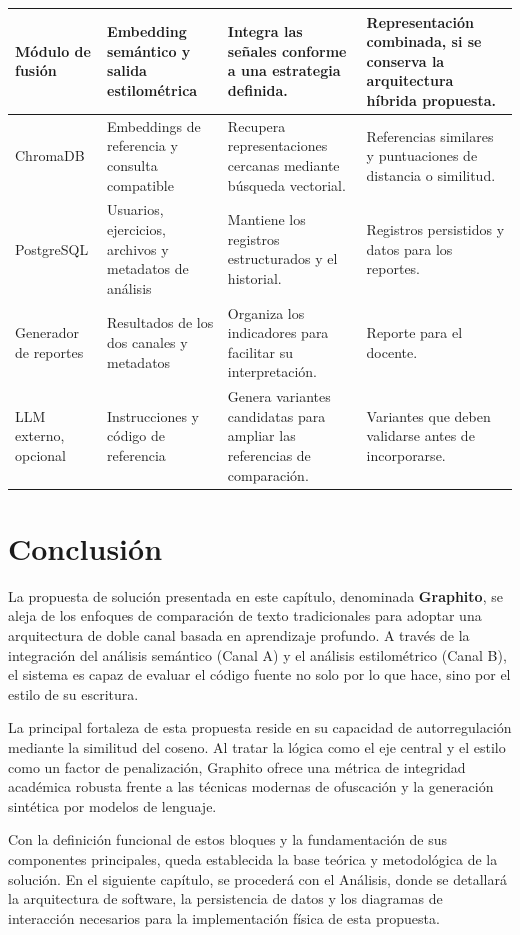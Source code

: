 {\begin{xltabular}{\textwidth}{|>{\raggedright\arraybackslash}p{2.6cm}|>{\raggedright\arraybackslash}X|>{\raggedright\arraybackslash}X|>{\raggedright\arraybackslash}X|}
    Módulo de fusión & Embedding semántico y salida estilométrica & Integra las señales conforme a una estrategia definida. & Representación combinada, si se conserva la arquitectura híbrida propuesta. \\ \hline
    ChromaDB & Embeddings de referencia y consulta compatible & Recupera representaciones cercanas mediante búsqueda vectorial. & Referencias similares y puntuaciones de distancia o similitud. \\ \hline
    PostgreSQL & Usuarios, ejercicios, archivos y metadatos de análisis & Mantiene los registros estructurados y el historial. & Registros persistidos y datos para los reportes. \\ \hline
    Generador de reportes & Resultados de los dos canales y metadatos & Organiza los indicadores para facilitar su interpretación. & Reporte para el docente. \\ \hline
    LLM externo, opcional & Instrucciones y código de referencia & Genera variantes candidatas para ampliar las referencias de comparación. & Variantes que deben validarse antes de incorporarse. \\ \hline
\end{xltabular}
}

\section{Conclusión}

La propuesta de solución presentada en este capítulo, denominada \textbf{Graphito}, se aleja de los enfoques de comparación de texto tradicionales para adoptar una arquitectura de doble canal basada en aprendizaje profundo. A través de la integración del análisis semántico (Canal A) y el análisis estilométrico (Canal B), el sistema es capaz de evaluar el código fuente no solo por lo que hace, sino por el estilo de su escritura.

La principal fortaleza de esta propuesta reside en su capacidad de autorregulación mediante la similitud del coseno. Al tratar la lógica como el eje central y el estilo como un factor de penalización, Graphito ofrece una métrica de integridad académica robusta frente a las técnicas modernas de ofuscación y la generación sintética por modelos de lenguaje.

Con la definición funcional de estos bloques y la fundamentación de sus componentes principales, queda establecida la base teórica y metodológica de la solución. En el siguiente capítulo, se procederá con el Análisis, donde se detallará la arquitectura de software, la persistencia de datos y los diagramas de interacción necesarios para la implementación física de esta propuesta.